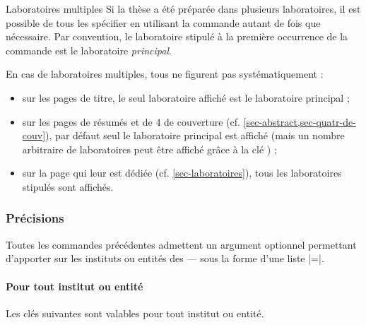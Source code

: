 %
\begin{dbremark}{Laboratoires multiples}{}
  Si la thèse a été préparée dans plusieurs laboratoires, il est possible de
  tous les spécifier en utilisant la commande  autant de
  fois que nécessaire. Par convention, le laboratoire stipulé à la première
   occurrence de la commande
   est le laboratoire \emph{principal}.

  En cas de laboratoires multiples, tous ne figurent pas systématiquement :
  \begin{itemize}
  \item sur les pages de titre, le seul laboratoire affiché est le
    laboratoire principal ;
  \item sur les pages de résumés et de 4\ieme{} de couverture
    (cf. \vref{sec-abstract,sec-quatr-de-couv}), par défaut seul le laboratoire
    principal est affiché (mais un nombre arbitraire de laboratoires peut être
    affiché grâce à la clé ) ;
  \item sur la page  qui leur est dédiée
    (cf. \vref{sec-laboratoires}), tous les laboratoires stipulés sont
    affichés.
  \end{itemize}
\end{dbremark}

\subsubsection{Précisions}

Toutes les commandes précédentes admettent un argument optionnel permettant
d'apporter sur les instituts ou entités des  --- sous la forme
d'une liste |=|.
%
\paragraph{Pour tout institut ou entité}

Les clés suivantes\syntaxeoptions{} sont valables pour tout institut ou entité.

